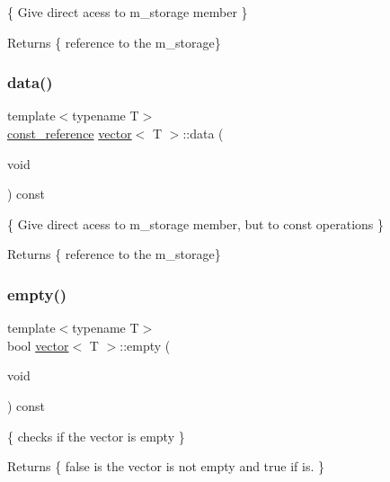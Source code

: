 \{ Give direct acess to m\+\_\+storage member \} 

\begin{DoxyReturn}{Returns}
\{ reference to the m\+\_\+storage\} 
\end{DoxyReturn}
\mbox{\label{classvector_adafc81f5b3fab39c4d61cae75615a4fa}} 
\subsubsection{\texorpdfstring{data()}{data()}\hspace{0.1cm}{\footnotesize\ttfamily [2/2]}}
{\footnotesize\ttfamily template$<$typename T$>$ \\
\hyperlink{classvector_aad263433b4072dfbc26ace0df6441960}{const\+\_\+reference} \hyperlink{classvector}{vector}$<$ T $>$\+::data (\begin{DoxyParamCaption}\item[{void}]{ }\end{DoxyParamCaption}) const\hspace{0.3cm}{\ttfamily [inline]}}



\{ Give direct acess to m\+\_\+storage member, but to const operations \} 

\begin{DoxyReturn}{Returns}
\{ reference to the m\+\_\+storage\} 
\end{DoxyReturn}
\mbox{\label{classvector_a0ee0e78b263a685dcddef3d193725bd8}} 
\subsubsection{\texorpdfstring{empty()}{empty()}}
{\footnotesize\ttfamily template$<$typename T$>$ \\
bool \hyperlink{classvector}{vector}$<$ T $>$\+::empty (\begin{DoxyParamCaption}\item[{void}]{ }\end{DoxyParamCaption}) const\hspace{0.3cm}{\ttfamily [inline]}}



\{ checks if the vector is empty \} 

\begin{DoxyReturn}{Returns}
\{ false is the vector is not empty and true if is. \} 
\end{DoxyReturn}
\mbox{\label{classvector_aad5e92e775a9fa4f98b5b0666b6c0e2d}} 
